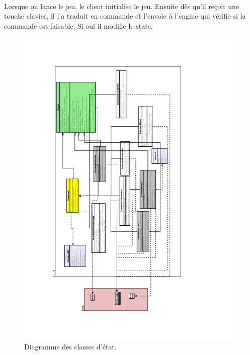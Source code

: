 \documentclass[a4paper,12pt]{article}
\begin{document}
\paragraph{}
Lorsque on lance le jeu, le client initialise le jeu. Ensuite dès qu'il reçoit une touche clavier, il l'a traduit en commande et l'envoie à l'engine qui vérifie si la commande est faisable. Si oui il modifie le state.
\newpage
\begin{landscape}
\begin{figure}[p]
\includegraphics[width=0.6\paperheight,angle=-90]{moteur.pdf}
\caption{\label{uml:state}Diagramme des classes d'état.}
\end{figure}
\end{landscape}

\clearpage



\end{document}
